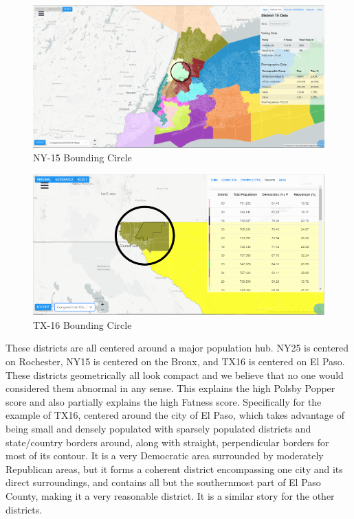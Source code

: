 \documentclass[letterpaper]{article}
\begin{document}
\begin{figure}[H]
	\includegraphics[width=\linewidth]{./figures/NY-15-BoundingCircle.png}
	\caption{NY-15 Bounding Circle}
	\label{fig:ny15boundingCircle}
\end{figure}

\begin{figure}[H]
	\includegraphics[width=\linewidth]{./figures/TX-16-BoundingCircle.png}
	\caption{TX-16 Bounding Circle}
	\label{fig:tx16boundingCircle}
\end{figure}


These districts are all centered around a major population hub. NY25 is centered on Rochester, NY15 is centered on the Bronx, and TX16 is centered on El Paso. These districts geometrically all look compact and we believe that no one would considered them abnormal in any sense. This explains the high Polsby Popper score and also partially explains the high Fatness score. Specifically for the example of TX16,
centered around the city of El Paso, which takes advantage of being small and densely populated with sparsely populated districts and state/country borders around, along with straight, perpendicular borders for most of its contour. It is a very Democratic area surrounded by moderately Republican areas, but it forms a coherent district encompassing one city and its direct surroundings, and contains all but the southernmost part of El Paso County, making it a very reasonable district. It is a similar story for the other districts.
\end{document}
